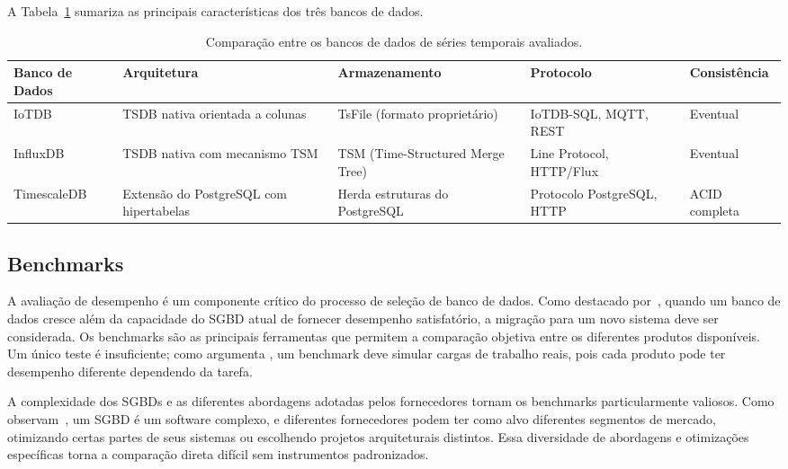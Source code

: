 A Tabela~\ref{tab:db_comparison} sumariza as principais características dos três bancos de dados.

\begin{table}[ht]
  \centering
  \caption{Comparação entre os bancos de dados de séries temporais avaliados.}
  \label{tab:db_comparison}
  \begin{tabular}{lllll}
    \hline
    \textbf{Banco de Dados} & \textbf{Arquitetura} & \textbf{Armazenamento} & \textbf{Protocolo} & \textbf{Consistência} \\
    \hline
    IoTDB      & TSDB nativa orientada a colunas                    & TsFile (formato proprietário)          & IoTDB-SQL, MQTT, REST         & Eventual      \\
    InfluxDB   & TSDB nativa com mecanismo TSM                      & TSM (Time-Structured Merge Tree)       & Line Protocol, HTTP/Flux      & Eventual      \\
    TimescaleDB & Extensão do PostgreSQL com hipertabelas            & Herda estruturas do PostgreSQL         & Protocolo PostgreSQL, HTTP    & ACID completa \\
    \hline
  \end{tabular}
\end{table}

\subsection{Benchmarks}

A avaliação de desempenho é um componente crítico do processo de seleção de banco de dados.
Como destacado por~\cite{Ramakrishnan2003}, quando um banco de dados cresce além da capacidade
do SGBD atual de fornecer desempenho satisfatório, a migração para um novo sistema deve ser
considerada. Os benchmarks são as principais ferramentas que permitem a comparação objetiva
entre os diferentes produtos disponíveis. Um único teste é insuficiente; como argumenta
\cite{silberschatz2020}, um benchmark deve simular cargas de trabalho reais, pois cada produto
pode ter desempenho diferente dependendo da tarefa.

A complexidade dos SGBDs e as diferentes abordagens adotadas pelos fornecedores tornam os
benchmarks particularmente valiosos. Como observam~\cite{Ramakrishnan2003}, um SGBD é um
software complexo, e diferentes fornecedores podem ter como alvo diferentes segmentos de
mercado, otimizando certas partes de seus sistemas ou escolhendo projetos arquiteturais
distintos. Essa diversidade de abordagens e otimizações específicas torna a comparação direta
difícil sem instrumentos padronizados.

